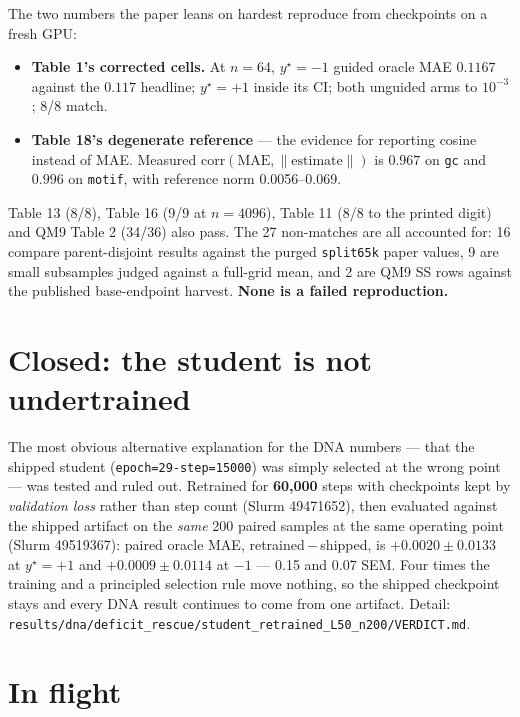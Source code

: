 \documentclass[10pt]{article}
\begin{document}
The two numbers the paper leans on hardest reproduce from checkpoints on a fresh GPU:

\begin{itemize}\itemsep2pt
\item \textbf{Table 1's corrected cells.} At $n{=}64$, $y^\star{=}{-}1$ guided oracle MAE
      $\mathbf{0.1167}$ against the $0.117$ headline; $y^\star{=}{+}1$ inside its CI; both unguided
      arms to $10^{-3}$; 8/8 match.
\item \textbf{Table 18's degenerate reference} --- the evidence for reporting cosine instead of MAE.
      Measured $\mathrm{corr}(\mathrm{MAE}, \lVert\text{estimate}\rVert)$ is $\mathbf{0.967}$ on
      \texttt{gc} and $\mathbf{0.996}$ on \texttt{motif}, with reference norm 0.0056--0.069.
\end{itemize}

\noindent Table 13 (8/8), Table 16 (9/9 at $n{=}4096$), Table 11 (8/8 to the printed digit) and
QM9 Table 2 (34/36) also pass. The 27 non-matches are all accounted for: 16 compare parent-disjoint
results against the purged \texttt{split65k} paper values, 9 are small subsamples judged against a
full-grid mean, and 2 are QM9 SS rows against the published base-endpoint harvest. \textbf{None is
a failed reproduction.}

\section{Closed: the student is not undertrained}

The most obvious alternative explanation for the DNA numbers --- that the shipped student
(\texttt{epoch=29-step=15000}) was simply selected at the wrong point --- was tested and ruled out.
Retrained for \textbf{60{,}000} steps with checkpoints kept by \emph{validation loss} rather than
step count (Slurm 49471652), then evaluated against the shipped artifact on the \emph{same} 200
paired samples at the same operating point (Slurm 49519367): paired oracle MAE,
retrained\,$-$\,shipped, is $\mathbf{+0.0020\pm0.0133}$ at $y^\star{=}{+}1$ and
$\mathbf{+0.0009\pm0.0114}$ at $-1$ --- 0.15 and 0.07 SEM. Four times the training and a principled
selection rule move nothing, so the shipped checkpoint stays and every DNA result continues to come
from one artifact. Detail:
\texttt{results/dna/deficit\_rescue/student\_retrained\_L50\_n200/VERDICT.md}.

\section{In flight}
\end{document}
